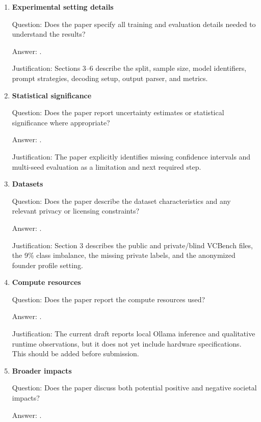 \begin{enumerate}
Answer: \answerYes{}.

Justification: The public data and scripts are in the repository. The
private/blind file is used only for prediction generation and is not presented as
a scored benchmark.

\item \textbf{Experimental setting details}

Question: Does the paper specify all training and evaluation details needed to
understand the results?

Answer: \answerYes{}.

Justification: Sections 3--6 describe the split, sample size, model identifiers,
prompt strategies, decoding setup, output parser, and metrics.

\item \textbf{Statistical significance}

Question: Does the paper report uncertainty estimates or statistical
significance where appropriate?

Answer: \answerNo{}.

Justification: The paper explicitly identifies missing confidence intervals and
multi-seed evaluation as a limitation and next required step.

\item \textbf{Datasets}

Question: Does the paper describe the dataset characteristics and any relevant
privacy or licensing constraints?

Answer: \answerYes{}.

Justification: Section 3 describes the public and private/blind VCBench files,
the 9\% class imbalance, the missing private labels, and the anonymized founder
profile setting.

\item \textbf{Compute resources}

Question: Does the paper report the compute resources used?

Answer: \answerNo{}.

Justification: The current draft reports local Ollama inference and qualitative
runtime observations, but it does not yet include hardware specifications. This
should be added before submission.

\item \textbf{Broader impacts}

Question: Does the paper discuss both potential positive and negative societal
impacts?

Answer: \answerYes{}.


\end{enumerate}
